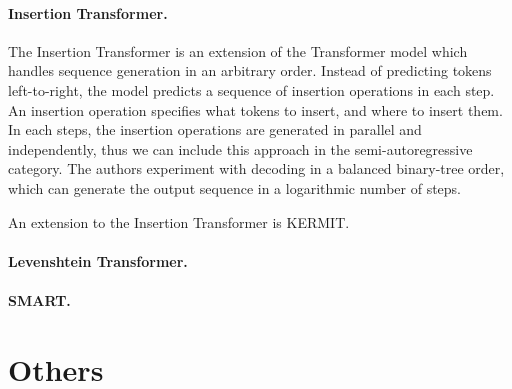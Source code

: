 \paragraph{Insertion Transformer.} The Insertion Transformer
\citep{stern-etal-2019-insertion} is an extension of the Transformer model
which handles sequence generation in an arbitrary order. Instead of predicting
tokens left-to-right, the model predicts a sequence of insertion operations in
each step. An insertion operation specifies what tokens to insert, and where to
insert them. In each steps, the insertion operations are generated in parallel
and independently, thus we can include this approach in the semi-autoregressive
category. The authors experiment with decoding in a balanced binary-tree order,
which can generate the output sequence in a logarithmic number of steps.

An extension to the Insertion Transformer is
KERMIT. \citep{chan-etal-2019-kermit} 


\paragraph{Levenshtein Transformer.} \citet{gu-etal-2019-levenshtein}

\paragraph{SMART.} \citet{ghazvininejad-etal-2020-semiautoregressive}




\section{Others}%
\label{sec:nat:misc}

